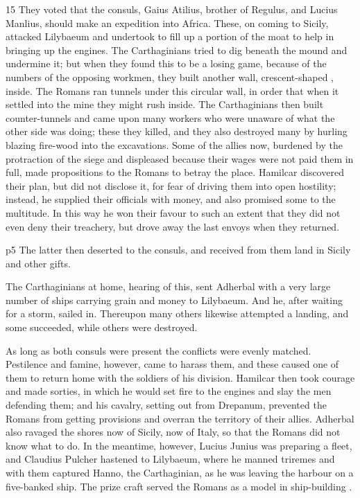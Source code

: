 15
They voted that the consuls, Gaius Atilius, brother of Regulus, and Lucius Manlius, should make an expedition into Africa. These, on coming to Sicily, attacked Lilybaeum and undertook to fill up a portion of the moat to help in bringing up the engines. The Carthaginians tried to dig beneath the mound and undermine it; but when they found this to be a losing game, because of the numbers of the opposing workmen, they built another wall, crescent-shaped , inside. The Romans ran tunnels under this circular wall, in order that when it settled into the mine they might rush inside. The Carthaginians then built counter-tunnels and came upon many workers who were unaware of what the other side was doing; these they killed, and they also destroyed many by hurling blazing fire-wood into the excavations. Some of the allies now, burdened by the protraction of the siege and displeased because their wages were not paid them in full, made propositions to the Romans to betray the place. Hamilcar discovered their plan, but did not disclose it, for fear of driving them into open hostility; instead, he supplied their officials with money, and also promised some to the multitude. In this way he won their favour to such an extent that they did not even deny their treachery, but drove away the last envoys when they returned.

p5 The latter then deserted to the consuls, and received from them land in Sicily and other gifts.

The Carthaginians at home, hearing of this, sent Adherbal with a very large number of ships carrying grain and money to Lilybaeum. And he, after waiting for a storm, sailed in. Thereupon many others likewise attempted a landing, and some succeeded, while others were destroyed.

As long as both consuls were present the conflicts were evenly matched. Pestilence and famine, however, came to harass them, and these caused one of them to return home with the soldiers of his division. Hamilcar then took courage and made sorties, in which he would set fire to the engines and slay the men defending them; and his cavalry, setting out from Drepanum, prevented the Romans from getting provisions and overran the territory of their allies. Adherbal also ravaged the shores now of Sicily, now of Italy, so that the Romans did not know what to do. In the meantime, however, Lucius Junius was preparing a fleet, and Claudius Pulcher hastened to Lilybaeum, where he manned triremes and with them captured Hanno, the Carthaginian, as he was leaving the harbour on a five-banked ship. The prize craft served the Romans as a model in ship-building .

